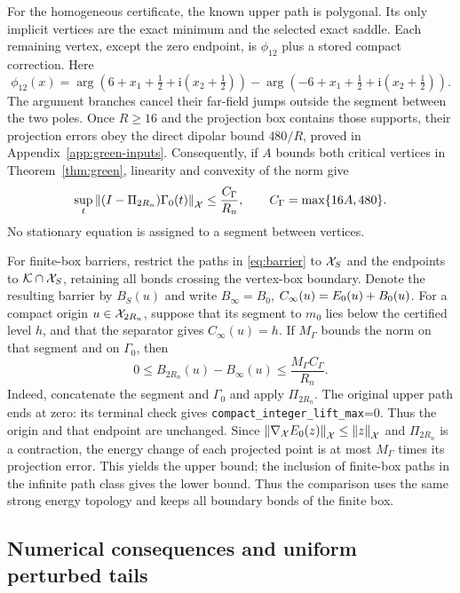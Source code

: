 For the homogeneous certificate, the known upper path is polygonal.
Its only implicit vertices are the exact minimum and the selected exact
saddle.  Each remaining vertex, except the zero endpoint, is $\phi_{12}$ plus a
stored compact correction. Here
\[
 \phi_{12}(x)=\arg(6+x_1+\tfrac12+\mathrm i(x_2+\tfrac12))
 -\arg(-6+x_1+\tfrac12+\mathrm i(x_2+\tfrac12)).
\]
The argument branches cancel their far-field jumps outside the segment
between the two poles.  Once $R\ge16$ and the projection box contains those supports, their
projection errors obey the direct dipolar bound $480/R$, proved in
Appendix~\ref{app:green-inputs}.
Consequently, if $A$ bounds both critical vertices in
Theorem~\ref{thm:green}, linearity and convexity of the norm give
\begin{equation}
 \sup_t\left\lVert(I-\Pi_{2R_n})\Gamma_0(t)\right\rVert_\mathcal X
 \le\frac{C_\Gamma}{R_n},\qquad
 C_\Gamma=\max\{16A,480\}.
 \label{eq:green-path}
\end{equation}
No stationary equation is assigned to a segment between vertices.

For finite-box barriers, restrict the paths in \eqref{eq:barrier} to
$\mathcal X_S$ and the endpoints to $\mathcal K\cap\mathcal X_S$, retaining all bonds crossing
the vertex-box boundary. Denote the resulting barrier by $B_S(u)$ and
write $B_\infty=B_0$, $C_\infty(u)=E_0(u)+B_0(u)$.
For a compact origin $u\in\mathcal X_{2R_n}$, suppose that its segment to $m_0$
lies below the certified level $h$, and that the separator gives
$C_\infty(u)=h$.  If $M_\Gamma$ bounds the norm on that segment and on
$\Gamma_0$, then
\begin{equation}
 0\le B_{2R_n}(u)-B_\infty(u)
 \le\frac{M_\Gamma C_\Gamma}{R_n}.
 \label{eq:green-barrier-localization}
\end{equation}
Indeed, concatenate the segment and $\Gamma_0$ and apply $\Pi_{2R_n}$.
The original upper path ends at zero: its terminal check gives
\texttt{compact\_integer\_lift\_max}=0.
Thus the origin and that endpoint are unchanged. Since
$\left\lVert\nabla_\mathcal XE_0(z)\right\rVert_\mathcal X\le\left\lVert z\right\rVert_\mathcal X$ and $\Pi_{2R_n}$ is a
contraction, the energy change of each projected point is at most
$M_\Gamma$ times its projection error.  This yields the upper bound;
the inclusion of finite-box paths in the infinite path class gives the
lower bound.  Thus the comparison uses the same strong energy topology
and keeps all boundary bonds of the finite box.

\subsection{Numerical consequences and uniform perturbed tails}

